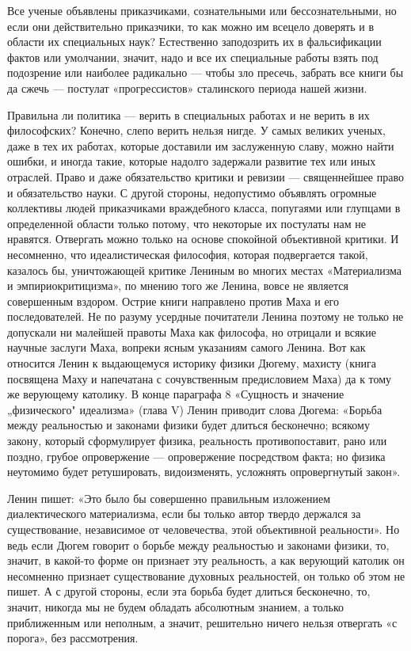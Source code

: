 Все ученые объявлены приказчиками, сознательными или бессознательными,
но если они действительно приказчики, то как можно им всецело доверять
и  в  области  их  специальных  наук?  Естественно  заподозрить  их  в
фальсификации фактов или умолчании, значит,  надо и все их специальные
работы  взять под  подозрение или  наиболее радикально  --- чтобы  зло
пресечь, забрать  все книги бы  да сжечь ---  постулат «прогрессистов»
сталинского периода нашей жизни.

Правильна ли политика  --- верить в специальных работах и  не верить в
их философских?  Конечно, слепо верить  нельзя нигде. У  самых великих
ученых,  даже  в тех  их  работах,  которые доставили  им  заслуженную
славу, можно найти  ошибки, и иногда такие,  которые надолго задержали
развитие тех или  иных отраслей. Право и даже  обязательство критики и
ревизии  ---  священнейшее  право  и  обязательство  науки.  С  другой
стороны, недопустимо объявлять  огромные коллективы людей приказчиками
враждебного  класса, попугаями  или  глупцами  в определенной  области
только потому, что  некоторые их постулаты нам  не нравятся. Отвергать
можно только  на основе  спокойной объективной критики.  И несомненно,
что  идеалистическая философия,  которая подвергается  такой, казалось
бы,  уничтожающей критике  Лениным  во многих  местах «Материализма  и
эмпириокритицизма»,  по  мнению  того  же Ленина,  вовсе  не  является
совершенным  вздором.  Острие  книги  направлено  против  Маха  и  его
последователей.  Не по  разуму усердные  почитатели Ленина  поэтому не
только не допускали ни малейшей правоты Маха как философа, но отрицали
и всякие научные заслуги Маха,  вопреки ясным указаниям самого Ленина.
Вот как относится Ленин к  выдающемуся историку физики Дюгему, махисту
(книга посвящена Маху и  напечатана с сочувственным предисловием Маха)
да  к тому  же верующему  католику. В  конце параграфа  8 «Сущность  и
значение  „физического"  идеализма»  (глава V)  Ленин  приводит  слова
Дюгема:  «Борьба между  реальностью  и законами  физики будет  длиться
бесконечно;  всякому закону,  который сформулирует  физика, реальность
противопоставит, рано или поздно, грубое опровержение --- опровержение
посредством   факта;   но   физика   неутомимо   будет   ретушировать,
видоизменять, усложнять опровергнутый закон».

Ленин   пишет:  «Это   было   бы   совершенно  правильным   изложением
диалектического  материализма, если  бы только  автор твердо  держался
за  существование,  независимое   от  человечества,  этой  объективной
реальности». Но  ведь если  Дюгем говорит  о борьбе  между реальностью
и  законами  физики,   то,  значит,  в  какой-то   форме  он  признает
эту  реальность,  а  как   верующий  католик  он  несомненно  признает
существование духовных  реальностей, он только  об этом не пишет.  А с
другой стороны, если эта борьба  будет длиться бесконечно, то, значит,
никогда мы не будем обладать абсолютным знанием, а только приближенным
или неполным, а значит, решительно ничего нельзя отвергать «с порога»,
без рассмотрения.

